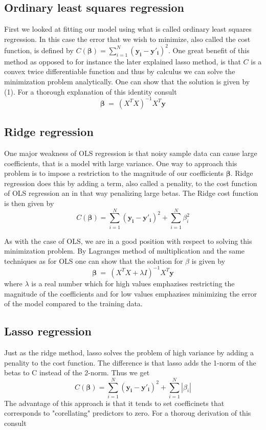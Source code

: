 \documentclass[a4paper,norsk]{article}
\begin{document}
\subsection{Ordinary least squares regression}
First we looked at fitting our model using what is called ordinary least
squares regression. In this case the error that we wish to minimize, 
also called the cost function, is defined by 
$C(\bm{\beta}) = \sum_{i=1}^N (\bm{y_i} - \bm{y'_i})^2$.
One great benefit of this method as opposed to for instance the 
later explained lasso method, is that $C$ is a convex twice 
differentiable function and thus by calculus we can solve the 
minimization problem analytically. One can show that the solution 
is given by (1). For a thorough explanation of this identity consult
\cite{hastie}
\begin{equation}
    \bm{\beta} \ = \ (X^TX)^{-1}X^T\bm{y}
\end{equation}

\subsection{Ridge regression}
One major weakness of OLS regression is that noisy sample data can cause
large coefficients, that is a model with large variance. One way
to approach this problem is to impose a restriction to the magnitude of 
our coefficients $\bm{\beta}$. Ridge regression does this by adding a
term, also called a penality, to the cost function of OLS regression 
an in that way penalizing large betas. The Ridge cost function is then 
given by
\begin{equation}
    C(\bm{\beta}) = \sum_{i=1}^N (\bm{y_i} - \bm{y'_i})^2 + 
    \sum_{i=1}^N \beta_i^2
\end{equation}
\par
As with the case of OLS, we are in a good position with respect to solving
this minimization problem. By Lagranges method of multiplication and the same techniques as for OLS one can show that the solution for $\beta$ is given
by
\begin{equation}
    \bm{\beta} \ = \ (X^TX + \lambda I)^{-1}X^T\bm{y}
\end{equation}
where $\lambda$ is a real number which for high values emphazises 
restricting the magnitude of the coefficients and for low values emphazises
minimizing the error of the model compared to the training data.

\subsection{Lasso regression}
Just as the ridge method, lasso solves the problem of high variance 
by adding a penality to the cost function. The difference is that 
lasso adds the 1-norm of the betas to C instead of the 2-norm. Thus we get
\begin{equation}
    C(\bm{\beta}) = \sum_{i=1}^N (\bm{y_i} - \bm{y'_i})^2 + 
    \sum_{i=1}^N |\beta_i|
\end{equation}
The advantage of this approach is that it tends to set coefficinets that
corresponds to "corellating" predictors to zero. For a thoroug derivation 
of this consult \cite{hastie}
\end{document}
